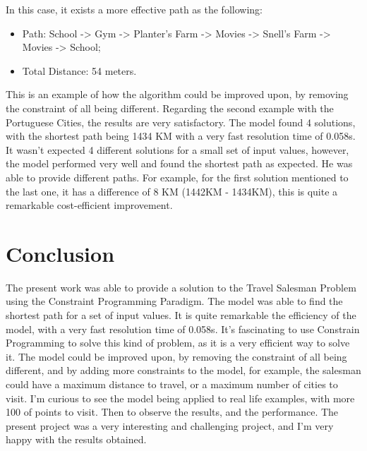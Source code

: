 \documentclass[runningheads,a4paper,english]{llncs}[2022/01/12]
\begin{document}
In this case, it exists a more effective path as the following:
\begin{itemize}
  \item Path: School -> Gym -> Planter's Farm -> Movies -> Snell’s Farm -> Movies -> School;
  \item Total Distance: 54 meters.
\end{itemize}

This is an example of how the algorithm could be improved upon, by removing the constraint of all being different.\newline
Regarding the second example with the Portuguese Cities, the results are very satisfactory. The model found 4 solutions, with the shortest path being 1434 KM with a very fast resolution time of 0.058s. It wasn’t expected 4 different solutions for a small set of input values, however, the model performed very well and found the shortest path as expected. \newline
He was able to provide different paths. For example, for the first solution mentioned to the last one, it has a difference of 8 KM (1442KM - 1434KM), this is quite a remarkable cost-efficient improvement.

\section{Conclusion}
\label{sec:Conclusion}
The present work was able to provide a solution to the Travel Salesman Problem using the Constraint Programming Paradigm. The model was able to find the shortest path for a set of input values. \newline
It is quite remarkable the efficiency of the model, with a very fast resolution time of 0.058s. \newline
It's fascinating to use Constrain Programming to solve this kind of problem, as it is a very efficient way to solve it. \newline
The model could be improved upon, by removing the constraint of all being different, and by adding more constraints to the model, for example, the salesman could have a maximum distance to travel, or a maximum number of cities to visit. \newline
I'm curious to see the model being applied to real life examples, with more 100 of points to visit. Then to observe the results, and the performance.
The present project was a very interesting and challenging project, and I'm very happy with the results obtained.


\renewcommand{\bibsection}{\section*{References}} %

\begingroup
  \small %
  
\endgroup

\ \\
%
\end{document}
